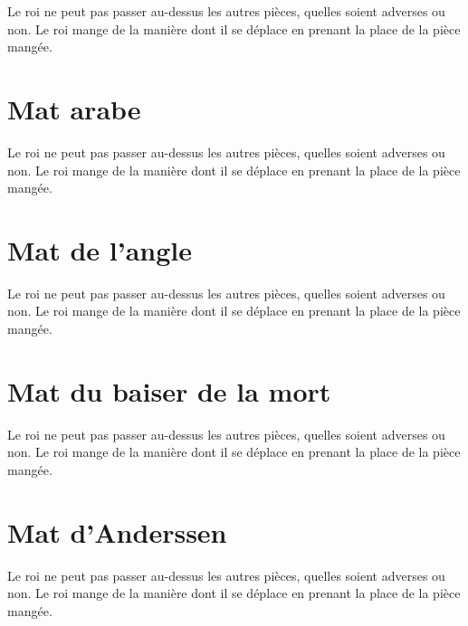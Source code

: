 \documentclass[a5paper,openany,twocolumn]{book}
\begin{document}
{Le roi ne peut pas passer au-dessus les autres pièces, quelles soient adverses ou non. Le roi mange de la manière dont il se déplace en prenant la place de la pièce mangée. 


\chapter{Mat arabe}
 
Le roi ne peut pas passer au-dessus les autres pièces, quelles soient adverses ou non. Le roi mange de la manière dont il se déplace en prenant la place de la pièce mangée. 


\chapter{Mat de l'angle}

Le roi ne peut pas passer au-dessus les autres pièces, quelles soient adverses ou non. Le roi mange de la manière dont il se déplace en prenant la place de la pièce mangée. 


\chapter{Mat du baiser de la mort}

Le roi ne peut pas passer au-dessus les autres pièces, quelles soient adverses ou non. Le roi mange de la manière dont il se déplace en prenant la place de la pièce mangée. 


\chapter{Mat d'Anderssen}
 
Le roi ne peut pas passer au-dessus les autres pièces, quelles soient adverses ou non. Le roi mange de la manière dont il se déplace en prenant la place de la pièce mangée. 

}
\end{document}
